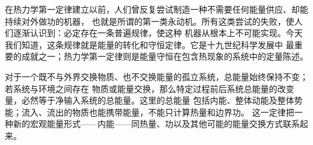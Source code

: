 {\renewcommand{\pistonWorkFaithful}{\begin{center}\begin{tikzpicture}[font=\small]
\foreach \sx/\top/\gas in {0/1.3/V,3/1.8/{V+\dd V}}{
\begin{scope}[shift={(\sx,0)}]\fill[DeepBlue!9](-.85,0)rectangle(.85,\top);
\draw[thick](-.85,2.4)--(-.85,0)--(.85,0)--(.85,2.4);
\draw[thick,fill=SoftGray](-.85,\top)rectangle(.85,{\top+.18});
\draw[thick](0,{\top+.18})--(0,{\top+1.25});\node at(0,.6){$\gas$};\end{scope}}
\draw[guide](3.85,1.3)--(4.25,1.3);\draw[<->](4.2,1.3)--node[right]{$\dd y$}(4.2,1.8);
\node at(1.5,-.6){$\dd V=A\dd y$};
\begin{scope}[shift={(6,0)},x=1.1cm,y=.8cm]
\draw[axis](0,0)--(5.3,0)node[right]{$V$};\draw[axis](0,0)--(0,4.9)node[above]{$P$};
\fill[PaleBlue](1,0)--plot[domain=1:4.5,samples=100](\x,{4/\x})--(4.5,0)--cycle;
\draw[cyclepath,domain=.9:4.8,samples=100]plot(\x,{4/\x});
\foreach \x/\s in {1/i,4.5/f}{\draw[guide](\x,0)--(\x,{4/\x});\fill(\x,{4/\x})circle(1.3pt)node[above right]{$\s$};\node[below]at(\x,0){$V_\s$};}
\node at(2.5,-1.1){$W^{\rm out}=\int_{V_i}^{V_f}P\,\dd V$};\end{scope}
\end{tikzpicture}\end{center}\nopagebreak[2]}


在热力学第一定律建立以前，人们曾反复尝试制造一种不需要任何能量供应、却能持续对外做功的机器，
也就是所谓的第一类永动机。所有这类尝试的失败，使人们逐渐认识到：必定存在一条普遍规律，使这种
机器从根本上不可能实现。今天我们知道，这条规律就是能量的转化和守恒定律。它是十九世纪科学发展中
最重要的成就之一；热力学第一定律则是能量守恒在包含热现象的系统中的定量陈述。

对于一个既不与外界交换物质、也不交换能量的孤立系统，总能量始终保持不变；若系统与环境之间存在
物质或能量交换，那么特定过程前后系统总能量的改变量，必然等于净输入系统的总能量。这里的总能量
包括内能、整体动能及整体势能；流入、流出的物质也能携带能量，不能只计算热量和边界功。
这一定律把一种新的宏观能量形式——内能——同热量、功以及其他可能的能量交换方式联系起来。

\par\noindent\begin{minipage}{\linewidth}
\perpetualMotionFaithful
{}\label{ch15:fig:s29-20-1}
\end{minipage}\par\medskip

}
